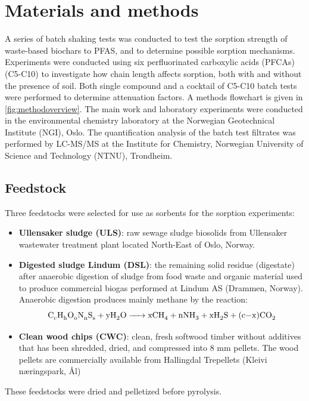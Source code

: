 \chapter{Materials and methods}\label{chap:MatlsMethds}
A series of batch shaking tests was conducted to test the sorption strength of waste-based biochars to PFAS, and to determine possible sorption mechanisms. Experiments were conducted using six perfluorinated carboxylic acids (PFCAs) (C5-C10) to investigate how chain length affects sorption, both with and without the presence of soil. Both single compound and a cocktail of C5-C10 batch tests were performed to determine attenuation factors. A methods flowchart is given in \cref{fig:methodoverview}. The main work and laboratory experiments were conducted in the environmental chemistry laboratory at the Norwegian Geotechnical Institute (NGI), Oslo. The quantification analysis of the batch test filtrates was performed by LC-MS/MS at the Institute for Chemistry, Norwegian University of Science and Technology (NTNU), Trondheim. 

\section{Feedstock}
Three feedstocks were selected for use as sorbents for the sorption experiments:

\begin{itemize}
    \item \textbf{Ullensaker sludge (ULS)}: raw sewage sludge biosolids from Ullensaker wastewater treatment plant located North-East of Oslo, Norway. 
    \item \textbf{Digested sludge Lindum (DSL)}: the remaining solid residue (digestate) after anaerobic digestion of sludge from food waste and organic material used to produce commercial biogas performed at Lindum AS (Drammen, Norway). Anaerobic digestion produces mainly methane by the reaction: 
        \begin{equation}
        \label{eq:AD}
            \ce{C_cH_hO_oN_nS_s + yH_2O -> xCH_4 + nNH_3 + xH_2S + (c-x)CO_2}
        \end{equation}
    \item \textbf{Clean wood chips (CWC)}: clean, fresh softwood timber without additives that has been shredded, dried, and compressed into 8 mm pellets. The wood pellets are commercially available from Hallingdal Trepellets (Kleivi næringspark, Ål)
\end{itemize}

These feedstocks were dried and pelletized before pyrolysis.

